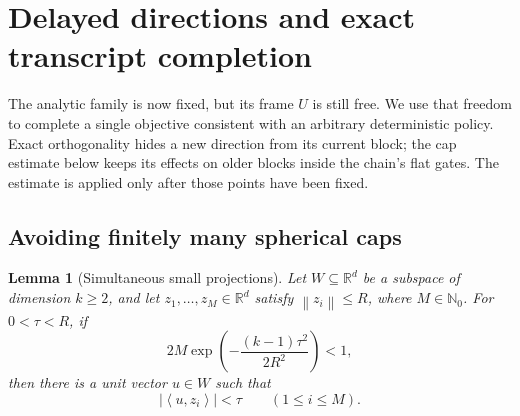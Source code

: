 \documentclass[11pt]{article}
\numberwithin{equation}{section}
\newtheorem{lemma}[lemma]{Lemma}
\theoremstyle{definition}
\theoremstyle{remark}
\newcommand{\R}{\mathbb{R}}
\newcommand{\Nzero}{\mathbb{N}_0}
\newcommand{\norm}[1]{\left\lVert #1\right\rVert}
\newcommand{\ip}[2]{\left\langle #1,#2\right\rangle}
\begin{document}
\section{Delayed directions and exact transcript completion}
\label{sec:transcript}

The analytic family is now fixed, but its frame $U$ is still free. We use
that freedom to complete a single objective consistent with an arbitrary
deterministic policy. Exact orthogonality hides a new direction from its
current block; the cap estimate below keeps its effects on older blocks
inside the chain's flat gates. The estimate is applied only after those
points have been fixed.

\subsection{Avoiding finitely many spherical caps}

\begin{lemma}[Simultaneous small projections]
\label{lem:caps}
Let $W\subseteq\R^d$ be a subspace of dimension $k\geq2$, and let
$z_1,\ldots,z_M\in\R^d$ satisfy $\norm{z_i}\leq R$, where
$M\in\Nzero$. For $0<\tau<R$, if
\begin{equation}
    2M\exp\!\left(-\frac{(k-1)\tau^2}{2R^2}\right)<1,
    \label{eq:cap-condition}
\end{equation}
then there is a unit vector $u\in W$ such that
\begin{equation}
    |\ip{u}{z_i}|<\tau\qquad (1\leq i\leq M).
    \label{eq:cap-conclusion}
\end{equation}
\end{lemma}
\end{document}
